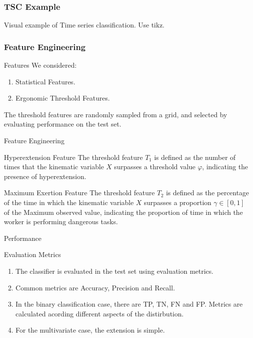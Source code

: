 \begin{frame}
    \frametitle{TSC Example}
   Visual example of Time series classification. Use tikz. 
\end{frame}

\begin{frame}
    \frametitle{Feature Engineering}
    \begin{alertblock}{Features}
       We considered:
       \begin{enumerate}
           \item Statistical Features.
           \item Ergonomic Threshold Features.
       \end{enumerate}
       The threshold features are randomly sampled from a grid, and selected by evaluating performance on the test set.
    \end{alertblock}
\end{frame}


\begin{frame}{Feature Engineering}
    \begin{alertblock}{Hyperextension Feature}
        The threshold feature $T_1$ is defined as the number of times that the kinematic 
        variable $X$ surpasses a threshold value $\varphi$, indicating the presence of
        hyperextension.
    \end{alertblock}

    \begin{alertblock}{Maximum Exertion Feature}
        The threshold feature $T_2$ is defined as the percentage of the time
        in which the kinematic variable $X$ surpasses a proportion $\gamma \in [0,1]$ of the Maximum
        observed value, indicating the proportion of time in which the worker is performing
        dangerous tasks.
    \end{alertblock}
\end{frame}



\begin{frame}{Performance}
    \begin{alertblock}{Evaluation Metrics}
       \begin{enumerate}
           \item The classifier is evaluated in the test set using evaluation metrics.
           \item Common metrics are Accuracy, Precision and Recall.
           \item In the binary classification case, there are TP, TN, FN and FP. Metrics are calculated acording different aspects of the distirbution.
           \item For the multivariate case, the extension is simple.
       \end{enumerate}
    \end{alertblock}
\end{frame}

